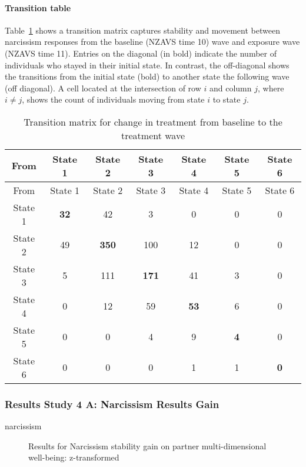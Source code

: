 \documentclass[
  singlecolumn]{article}
\let\oldparagraph\paragraph
\renewcommand{\paragraph}[1]{\oldparagraph{#1}\mbox{}}
\begin{document}
\paragraph{Transition table}\label{transition-table-3}

Table~\ref{tbl-transition-narcissism} shows a transition matrix captures
stability and movement between narcissism responses from the baseline
(NZAVS time 10) wave and exposure wave (NZAVS time 11). Entries on the
diagonal (in bold) indicate the number of individuals who stayed in
their initial state. In contrast, the off-diagonal shows the transitions
from the initial state (bold) to another state the following wave (off
diagonal). A cell located at the intersection of row \(i\) and column
\(j\), where \(i \neq j\), shows the count of individuals moving from
state \(i\) to state \(j\).

\begin{longtable}[]{@{}ccccccc@{}}
\caption{Transition matrix for change in treatment from baseline to the
treatment wave}\label{tbl-transition-narcissism}\tabularnewline
\toprule\noalign{}
From & State 1 & State 2 & State 3 & State 4 & State 5 & State 6 \\
\midrule\noalign{}
\endfirsthead
\toprule\noalign{}
From & State 1 & State 2 & State 3 & State 4 & State 5 & State 6 \\
\midrule\noalign{}
\endhead
\bottomrule\noalign{}
\endlastfoot
State 1 & \textbf{32} & 42 & 3 & 0 & 0 & 0 \\
State 2 & 49 & \textbf{350} & 100 & 12 & 0 & 0 \\
State 3 & 5 & 111 & \textbf{171} & 41 & 3 & 0 \\
State 4 & 0 & 12 & 59 & \textbf{53} & 6 & 0 \\
State 5 & 0 & 0 & 4 & 9 & \textbf{4} & 0 \\
State 6 & 0 & 0 & 0 & 1 & 1 & \textbf{0} \\
\end{longtable}

\subsubsection{Results Study 4 A: Narcissism Results
Gain}\label{results-study-4-a-narcissism-results-gain}

narcissism

\begin{figure}


\caption{\label{fig-results-narcissism-gain}Results for Narcissism
stability gain on partner multi-dimensional well-being: z-transformed}

\end{figure}%
\end{document}
